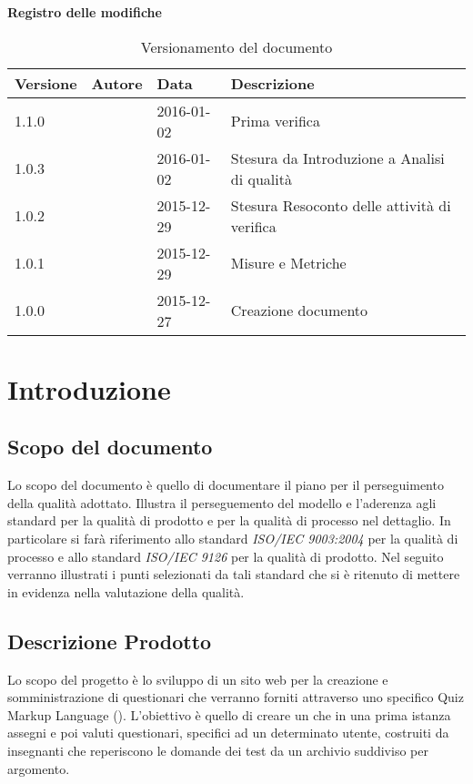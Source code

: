 \documentclass[12pt,a4paper]{article}
\begin{document}
\Large{\textbf{Registro delle modifiche}}\\
\normalsize

\begin{table}[h]
\begin{center}

\begin{tabular}{p{} p{} p{} p{}}
\toprule
\textbf{Versione}	&	\textbf{Autore}	&	\textbf{Data}	&	\textbf{Descrizione}\\
\midrule
\midrule
1.1.0 & \NDC{} & 2016-01-02 & Prima verifica \\
\midrule
1.0.3 & \AB{} & 2016-01-02 &  Stesura da Introduzione a Analisi di qualità\\
\midrule
1.0.2 & \IB{} & 2015-12-29 &  Stesura Resoconto delle attività di verifica\\
\midrule
1.0.1 & \AVI{} & 2015-12-29 &  Misure e Metriche \\
\midrule
1.0.0 & \IB{} & 2015-12-27 &  Creazione documento \\
\bottomrule
\end{tabular}
\caption{Versionamento del documento}
\label{tabVers1}
\end{center}
\end{table}

\newpage
\tableofcontents
\newpage

\listoftables
\listoffigures
\newpage

\section{Introduzione}
\subsection{Scopo del documento}
Lo scopo del documento è quello di documentare il piano per il perseguimento della qualità adottato. Illustra il perseguemento del modello  e l'aderenza agli standard per la qualità di prodotto e per la qualità di processo nel dettaglio. In particolare si farà riferimento allo standard \textit{ISO/IEC 9003:2004} per la qualità di processo e allo standard \textit{ISO/IEC 9126} per la qualità di prodotto.
Nel seguito verranno illustrati i punti selezionati da tali standard che si è ritenuto di mettere in evidenza nella valutazione della qualità.

\subsection{Descrizione Prodotto}
Lo scopo del progetto è lo sviluppo di un sito web per la creazione e somministrazione di questionari che verranno forniti attraverso uno specifico Quiz Markup Language (). L'obiettivo è quello di creare un  che in una prima istanza assegni e poi valuti questionari, specifici ad un determinato utente, costruiti da insegnanti che reperiscono le domande dei test da un archivio suddiviso per argomento.
\end{document}
